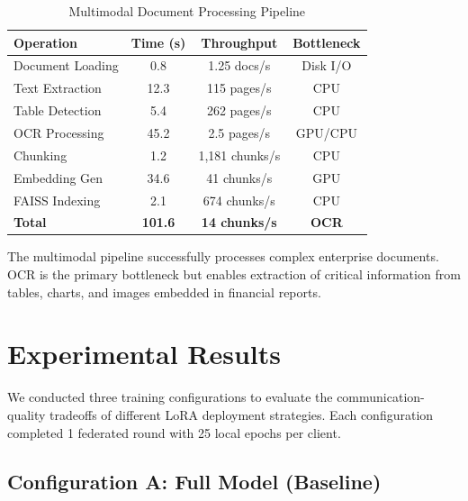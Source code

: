 \documentclass[conference]{IEEEtran}
\begin{document}
\begin{table}[h]
\centering
\caption{Multimodal Document Processing Pipeline}
\label{tab:multimodal}
\begin{tabular}{@{}lccc@{}}
\toprule
\textbf{Operation} & \textbf{Time (s)} & \textbf{Throughput} & \textbf{Bottleneck} \\
\midrule
Document Loading & 0.8 & 1.25 docs/s & Disk I/O \\
Text Extraction & 12.3 & 115 pages/s & CPU \\
Table Detection & 5.4 & 262 pages/s & CPU \\
OCR Processing & 45.2 & 2.5 pages/s & GPU/CPU \\
Chunking & 1.2 & 1,181 chunks/s & CPU \\
Embedding Gen & 34.6 & 41 chunks/s & GPU \\
FAISS Indexing & 2.1 & 674 chunks/s & CPU \\
\midrule
\textbf{Total} & \textbf{101.6} & \textbf{14 chunks/s} & \textbf{OCR} \\
\bottomrule
\end{tabular}
\end{table}

The multimodal pipeline successfully processes complex enterprise documents. OCR is the primary bottleneck but enables extraction of critical information from tables, charts, and images embedded in financial reports.

\section{Experimental Results}

We conducted three training configurations to evaluate the communication-quality tradeoffs of different LoRA deployment strategies. Each configuration completed 1 federated round with 25 local epochs per client.

\subsection{Configuration A: Full Model (Baseline)}
\end{document}
